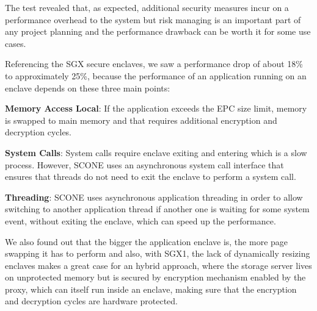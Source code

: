The test revealed that, as expected, additional security measures incur on a performance overhead to the system but risk managing is an important part of any project planning and the performance drawback can be worth it for some use cases.

Referencing the \gls{SGX} secure enclaves, we saw a performance drop of about 18\% to approximately 25\%, because the performance of an application running on an enclave depends on these three main points:

\textbf{Memory Access Local}: If the application exceeds the \gls{EPC} size limit, memory is swapped to main memory and that requires additional encryption and decryption cycles.

\textbf{System Calls}: System calls require enclave exiting and entering which is a slow process. However, SCONE uses an asynchronous system call interface that ensures that threads do not need to exit the enclave to perform a system call.

\textbf{Threading}: SCONE uses asynchronous application threading in order to allow switching to another application thread if another one is waiting for some system event, without exiting the enclave, which can speed up the performance.

We also found out that the bigger the application enclave is, the more page swapping it has to perform and also, with \gls{SGX}1, the lack of dynamically resizing enclaves makes a great case for an hybrid approach, where the storage server lives on unprotected memory but is secured by encryption mechanism enabled by the proxy, which can itself run inside an enclave, making sure that the encryption and decryption cycles are hardware protected.
